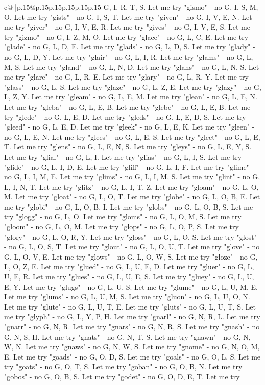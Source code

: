 \documentclass{article}
\begin{document}
{\begin{supertabular}{c@{$\;$}|p{.15\linewidth}@{}p{.15\linewidth}p{.15\linewidth}p{.15\linewidth}p{.15\linewidth}p{.15\linewidth}}
{{{G, I, R, T, S. Let me try "gismo" {-} no G, I, S, M, O. Let me try "gists" {-} no G, I, S, T. Let me try "given" {-} no G, I, V, E, N. Let me try "giver" {-} no G, I, V, E, R. Let me try "gives" {-} no G, I, V, E, S. Let me try "gizmo" {-} no G, I, Z, M, O. Let me try "glace" {-} no G, L, C, E. Let me try "glade" {-} no G, L, D, E. Let me try "glads" {-} no G, L, D, S. Let me try "glady" {-} no G, L, D, Y. Let me try "glair" {-} no G, L, I, R. Let me try "glams" {-} no G, L, M, S. Let me try "gland" {-} no G, L, N, D. Let me try "glans" {-} no G, L, N, S. Let me try "glare" {-} no G, L, R, E. Let me try "glary" {-} no G, L, R, Y. Let me try "glass" {-} no G, L, S. Let me try "glaze" {-} no G, L, Z, E. Let me try "glazy" {-} no G, L, Z, Y. Let me try "gleam" {-} no G, L, E, M. Let me try "glean" {-} no G, L, E, N. Let me try "gleba" {-} no G, L, E, B. Let me try "glebe" {-} no G, L, E, B. Let me try "glede" {-} no G, L, E, D. Let me try "gleds" {-} no G, L, E, D, S. Let me try "gleed" {-} no G, L, E, D. Let me try "gleek" {-} no G, L, E, K. Let me try "gleen" {-} no G, L, E, N. Let me try "glees" {-} no G, L, E, S. Let me try "gleet" {-} no G, L, E, T. Let me try "glens" {-} no G, L, E, N, S. Let me try "gleys" {-} no G, L, E, Y, S. Let me try "glial" {-} no G, L, I. Let me try "glias" {-} no G, L, I, S. Let me try "glide" {-} no G, L, I, D, E. Let me try "gliff" {-} no G, L, I, F. Let me try "glime" {-} no G, L, I, M, E. Let me try "glims" {-} no G, L, I, M, S. Let me try "glint" {-} no G, L, I, N, T. Let me try "glitz" {-} no G, L, I, T, Z. Let me try "gloam" {-} no G, L, O, M. Let me try "gloat" {-} no G, L, O, T. Let me try "globe" {-} no G, L, O, B, E. Let me try "globi" {-} no G, L, O, B, I. Let me try "globs" {-} no G, L, O, B, S. Let me try "glogg" {-} no G, L, O. Let me try "gloms" {-} no G, L, O, M, S. Let me try "gloom" {-} no G, L, O, M. Let me try "glops" {-} no G, L, O, P, S. Let me try "glory" {-} no G, L, O, R, Y. Let me try "gloss" {-} no G, L, O, S. Let me try "glost" {-} no G, L, O, S, T. Let me try "glout" {-} no G, L, O, U, T. Let me try "glove" {-} no G, L, O, V, E. Let me try "glows" {-} no G, L, O, W, S. Let me try "gloze" {-} no G, L, O, Z, E. Let me try "glued" {-} no G, L, U, E, D. Let me try "gluer" {-} no G, L, U, E, R. Let me try "glues" {-} no G, L, U, E, S. Let me try "gluey" {-} no G, L, U, E, Y. Let me try "glugs" {-} no G, L, U, S. Let me try "glume" {-} no G, L, U, M, E. Let me try "glums" {-} no G, L, U, M, S. Let me try "gluon" {-} no G, L, U, O, N. Let me try "glute" {-} no G, L, U, T, E. Let me try "gluts" {-} no G, L, U, T, S. Let me try "glyph" {-} no G, L, Y, P, H. Let me try "gnarl" {-} no G, N, R, L. Let me try "gnarr" {-} no G, N, R. Let me try "gnars" {-} no G, N, R, S. Let me try "gnash" {-} no G, N, S, H. Let me try "gnats" {-} no G, N, T, S. Let me try "gnawn" {-} no G, N, W, N. Let me try "gnaws" {-} no G, N, W, S. Let me try "gnome" {-} no G, N, O, M, E. Let me try "goads" {-} no G, O, D, S. Let me try "goals" {-} no G, O, L, S. Let me try "goats" {-} no G, O, T, S. Let me try "goban" {-} no G, O, B, N. Let me try "gobos" {-} no G, O, B, S. Let me try "godet" {-} no G, O, D, E, T. Let me try }}}
\end{supertabular}}
\end{document}
